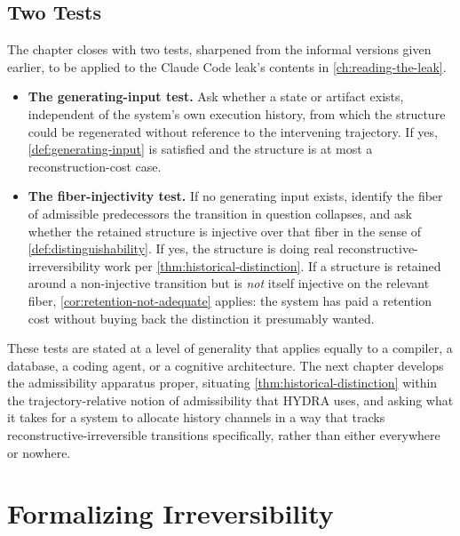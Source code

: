 \documentclass[11pt]{book}
\theoremstyle{plain}
\theoremstyle{definition}
\theoremstyle{remark}
\begin{document}
\section{Two Tests}

The chapter closes with two tests, sharpened from the informal
versions given earlier, to be applied to the Claude Code leak's
contents in \cref{ch:reading-the-leak}.

\begin{itemize}
\item \textbf{The generating-input test.} Ask whether a state or
artifact exists, independent of the system's own execution history,
from which the structure could be regenerated without reference to the
intervening trajectory. If yes, \cref{def:generating-input} is
satisfied and the structure is at most a reconstruction-cost case.
\item \textbf{The fiber-injectivity test.} If no generating input
exists, identify the fiber of admissible predecessors the transition
in question collapses, and ask whether the retained structure is
injective over that fiber in the sense of
\cref{def:distinguishability}. If yes, the structure is doing real
reconstructive-irreversibility work per
\cref{thm:historical-distinction}. If a structure is retained around a
non-injective transition but is \emph{not} itself injective on the
relevant fiber, \cref{cor:retention-not-adequate} applies: the system
has paid a retention cost without buying back the distinction it
presumably wanted.
\end{itemize}

These tests are stated at a level of generality that applies equally
to a compiler, a database, a coding agent, or a cognitive architecture.
The next chapter develops the admissibility apparatus proper, situating
\cref{thm:historical-distinction} within the trajectory-relative notion
of admissibility that HYDRA uses, and asking what it takes for a system
to allocate history channels in a way that tracks
reconstructive-irreversible transitions specifically, rather than
either everywhere or nowhere.
\chapter{Formalizing Irreversibility}
\label{ch:formalizing-irreversibility}
\end{document}
